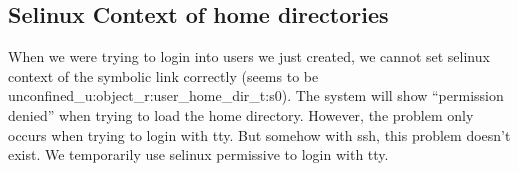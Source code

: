 \documentclass{article}
\begin{document}
\subsection{Selinux Context of home directories}
When we were trying to login into users we just created, we cannot set selinux context of the symbolic link correctly (seems to be unconfined\_u:object\_r:user\_home\_dir\_t:s0). The system will show ``permission denied'' when trying to load the home directory. However, the problem only occurs when trying to login with tty. But somehow  with ssh, this problem doesn't exist. We temporarily use selinux permissive to login with tty.
\end{document}
